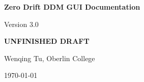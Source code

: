 \begin{titlepage}
    \centering
    \vspace*{2cm}
    
    {\Huge\bfseries Zero Drift DDM GUI Documentation\par}
    \vspace{1cm}
    {\LARGE Version 3.0\par}
    \vspace{1.5cm}
    {\Huge\bfseries UNFINISHED DRAFT\par}
    \vspace{2cm}
    {\Large Wenqing Tu, Oberlin College\par}
    \vspace{1cm}
    {\Large \today\par}
    
    \vfill
\end{titlepage}